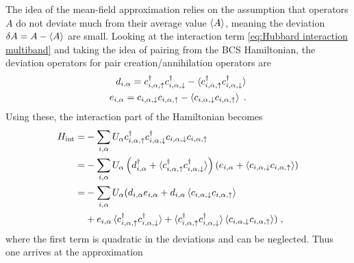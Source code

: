 \documentclass[../notes.tex]{subfiles}
\begin{document}
The idea of the mean-field approximation relies on the assumption that operators \(A\) do not deviate much from their average value \(\braket{A}\), meaning the deviation \(\fdif{A} = A - \braket{A}\) are small.
Looking at the interaction term \cref{eq:Hubbard interaction multiband} and taking the idea of pairing from the BCS Hamiltonian, the deviation operators for pair creation/annihilation operators are
\begin{align}
	d_{i, \alpha} = c_{i, \alpha, \uparrow}^{\dagger} c_{i, \alpha, \downarrow}^{\dagger} - \braket{c_{i, \alpha, \uparrow}^{\dagger} c_{i, \alpha, \downarrow}^{\dagger}} \nonumber \\
	e_{i, \alpha} = c_{i, \alpha, \downarrow} c_{i, \alpha, \uparrow} - \braket{c_{i, \alpha, \downarrow} c_{i, \alpha, \uparrow}} \;.
\end{align}
Using these, the interaction part of the Hamiltonian becomes
\begin{align}
	H_{\mathrm{int}} = &-\sum_{i, \alpha} U_{\alpha} c_{i, \alpha, \uparrow}^{\dagger} c_{i, \alpha, \downarrow}^{\dagger} c_{i, \alpha, \downarrow} c_{i, \alpha, \uparrow} \\
	= &-\sum_{i, \alpha} U_{\alpha} 
	\left( d_{i, \alpha}^{\dagger} + \braket{c_{i, \alpha, \uparrow}^{\dagger} c_{i, \alpha, \downarrow}^{\dagger}} \right)
	\left( e_{i, \alpha} + \braket{c_{i, \alpha, \downarrow} c_{i, \alpha, \uparrow}} \right) \\
	= &-\sum_{i, \alpha} U_{\alpha} (
		d_{i, \alpha} e_{i, \alpha}
		+ d_{i, \alpha} \braket{c_{i, \alpha, \downarrow} c_{i, \alpha, \uparrow}} \nonumber \\
		&+ e_{i, \alpha} \braket{c_{i, \alpha, \uparrow}^{\dagger} c_{i, \alpha, \downarrow}^{\dagger}}
		+ \braket{c_{i, \alpha, \uparrow}^{\dagger} c_{i, \alpha, \downarrow}^{\dagger}} \braket{c_{i, \alpha, \downarrow} c_{i, \alpha, \uparrow}}) \;,
\end{align}
where the first term is quadratic in the deviations and can be neglected.
Thus one arrives at the approximation
\end{document}
